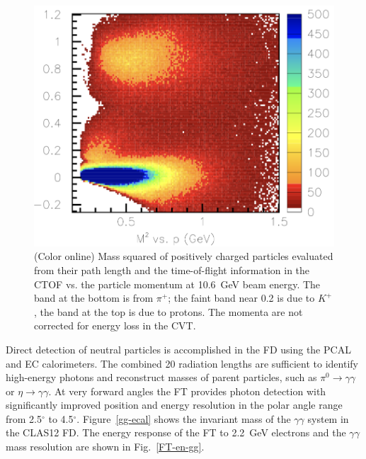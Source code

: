 \documentclass[final,3p,twocolumn]{elsarticle}
\begin{document}
\begin{figure}[t!]
\centerline{\includegraphics[width=1.\columnwidth]{ctof-pid-3.png}}
\caption{(Color online) Mass squared of positively charged particles evaluated from their path length and the time-of-flight
  information in the CTOF vs. the particle momentum at 10.6~GeV beam energy. The band at the bottom is from
  $\pi^+$; the faint band near 0.2 is due to $K^+$, the band at the top is due to protons. The momenta are not
  corrected for energy loss in the CVT.}
\label{CD-PID}
\end{figure} 

Direct detection of neutral particles is accomplished in the FD using the PCAL and EC calorimeters. The combined
20 radiation lengths are sufficient to identify high-energy photons and reconstruct masses of parent particles, such
as $\pi^0\to \gamma \gamma$  or $\eta \to \gamma \gamma$. At very forward angles the FT provides photon
detection with significantly improved position and energy resolution in the polar angle range from 2.5$^\circ$ to
4.5$^\circ$. Figure~\ref{gg-ecal} shows the invariant mass of the $\gamma\gamma$ system in the CLAS12 FD.
The energy response of the FT to 2.2~GeV electrons and the $\gamma \gamma$ mass resolution are shown in
Fig.~\ref{FT-en-gg}. 
\end{document}
